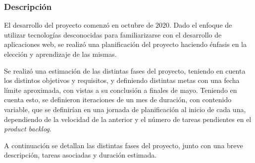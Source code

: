 \documentclass[10pt, a4paper]{aqademic}
\begin{document}
\subsubsection{Descripción}

El desarrollo del proyecto comenzó en octubre de 2020. Dado el enfoque de utilizar tecnologías desconocidas para familiarizarse con el desarrollo
de aplicaciones web, se realizó una planificación del proyecto haciendo énfasis en la elección y aprendizaje de las mismas.

Se realizó una estimación de las distintas fases del proyecto, teniendo en cuenta los distintos objetivos y requisitos, y definiendo distintas metas con
una fecha límite aproximada, con vistas a su conclusión a finales de mayo. Teniendo en cuenta esto, se definieron iteraciones de un mes de duración, con contenido variable, que se definirían en una jornada de planificación al inicio de cada una, dependiendo de la velocidad de la anterior y el número de tareas pendientes en el \textit{product backlog}.

A continuación se detallan las distintas fases del proyecto, junto con una breve descripción, tareas asociadas y duración estimada.
\end{document}
